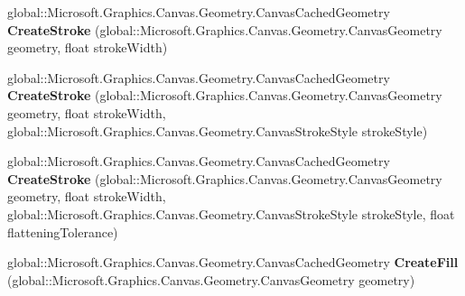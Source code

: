 \begin{DoxyCompactItemize}
\mbox{\label{interface_microsoft_1_1_graphics_1_1_canvas_1_1_geometry_1_1_i_canvas_cached_geometry_statics_a979cdeceea3a10a40d02ca0440985082}} 
global\+::\+Microsoft.\+Graphics.\+Canvas.\+Geometry.\+Canvas\+Cached\+Geometry {\bfseries Create\+Stroke} (global\+::\+Microsoft.\+Graphics.\+Canvas.\+Geometry.\+Canvas\+Geometry geometry, float stroke\+Width)
\item 
\mbox{\label{interface_microsoft_1_1_graphics_1_1_canvas_1_1_geometry_1_1_i_canvas_cached_geometry_statics_a468aa4e2b6369a93bc595faa4775ecd3}} 
global\+::\+Microsoft.\+Graphics.\+Canvas.\+Geometry.\+Canvas\+Cached\+Geometry {\bfseries Create\+Stroke} (global\+::\+Microsoft.\+Graphics.\+Canvas.\+Geometry.\+Canvas\+Geometry geometry, float stroke\+Width, global\+::\+Microsoft.\+Graphics.\+Canvas.\+Geometry.\+Canvas\+Stroke\+Style stroke\+Style)
\item 
\mbox{\label{interface_microsoft_1_1_graphics_1_1_canvas_1_1_geometry_1_1_i_canvas_cached_geometry_statics_af2be06fab26ecb06f7f43abc6c9f7a87}} 
global\+::\+Microsoft.\+Graphics.\+Canvas.\+Geometry.\+Canvas\+Cached\+Geometry {\bfseries Create\+Stroke} (global\+::\+Microsoft.\+Graphics.\+Canvas.\+Geometry.\+Canvas\+Geometry geometry, float stroke\+Width, global\+::\+Microsoft.\+Graphics.\+Canvas.\+Geometry.\+Canvas\+Stroke\+Style stroke\+Style, float flattening\+Tolerance)
\item 
\mbox{\label{interface_microsoft_1_1_graphics_1_1_canvas_1_1_geometry_1_1_i_canvas_cached_geometry_statics_a16df585fb0ca36d40ef89871533acc2a}} 
global\+::\+Microsoft.\+Graphics.\+Canvas.\+Geometry.\+Canvas\+Cached\+Geometry {\bfseries Create\+Fill} (global\+::\+Microsoft.\+Graphics.\+Canvas.\+Geometry.\+Canvas\+Geometry geometry)
\item 
\mbox{\label{interface_microsoft_1_1_graphics_1_1_canvas_1_1_geometry_1_1_i_canvas_cached_geometry_statics_af902923a82387d578dcc6b4a2ac54662}} 

\end{DoxyCompactItemize}
